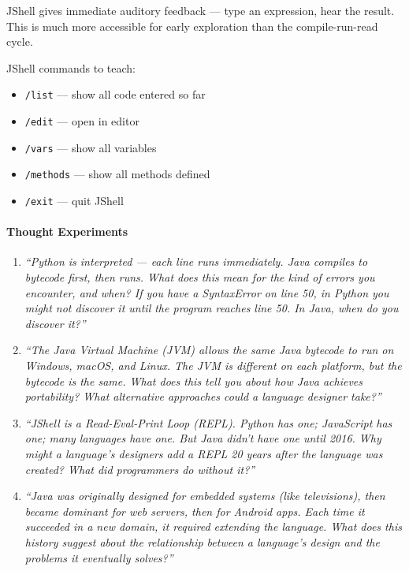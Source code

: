 \documentclass[
  justified,
  openright,
]{tufte-book}
\let\paragraph\paragraph
\let\paragraph\paragraph
\providecommand{\tightlist}{%
  \setlength{\itemsep}{0pt}\setlength{\parskip}{0pt}}
\begin{document}
JShell gives immediate auditory feedback --- type an expression, hear
the result. This is much more accessible for early exploration than the
compile-run-read cycle.

JShell commands to teach:

\begin{itemize}
\tightlist
\item
  \texttt{/list} --- show all code entered so far
\item
  \texttt{/edit} --- open in editor
\item
  \texttt{/vars} --- show all variables
\item
  \texttt{/methods} --- show all methods defined
\item
  \texttt{/exit} --- quit JShell
\end{itemize}

\paragraph{Thought Experiments}\label{thought-experiments}

\begin{enumerate}
\def\labelenumi{\arabic{enumi}.}
\item
  \emph{``Python is interpreted --- each line runs immediately. Java
  compiles to bytecode first, then runs. What does this mean for the
  kind of errors you encounter, and when? If you have a SyntaxError on
  line 50, in Python you might not discover it until the program reaches
  line 50. In Java, when do you discover it?''}
\item
  \emph{``The Java Virtual Machine (JVM) allows the same Java bytecode
  to run on Windows, macOS, and Linux. The JVM is different on each
  platform, but the bytecode is the same. What does this tell you about
  how Java achieves portability? What alternative approaches could a
  language designer take?''}
\item
  \emph{``JShell is a Read-Eval-Print Loop (REPL). Python has one;
  JavaScript has one; many languages have one. But Java didn't have one
  until 2016. Why might a language's designers add a REPL 20 years after
  the language was created? What did programmers do without it?''}
\item
  \emph{``Java was originally designed for embedded systems (like
  televisions), then became dominant for web servers, then for Android
  apps. Each time it succeeded in a new domain, it required extending
  the language. What does this history suggest about the relationship
  between a language's design and the problems it eventually solves?''}
\end{enumerate}
\end{document}
